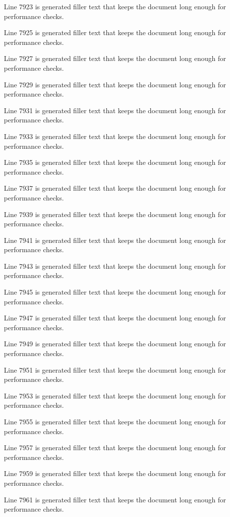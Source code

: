 Line 7923 is generated filler text that keeps the document long enough for performance checks.

Line 7925 is generated filler text that keeps the document long enough for performance checks.

Line 7927 is generated filler text that keeps the document long enough for performance checks.

Line 7929 is generated filler text that keeps the document long enough for performance checks.

Line 7931 is generated filler text that keeps the document long enough for performance checks.

Line 7933 is generated filler text that keeps the document long enough for performance checks.

Line 7935 is generated filler text that keeps the document long enough for performance checks.

Line 7937 is generated filler text that keeps the document long enough for performance checks.

Line 7939 is generated filler text that keeps the document long enough for performance checks.

Line 7941 is generated filler text that keeps the document long enough for performance checks.

Line 7943 is generated filler text that keeps the document long enough for performance checks.

Line 7945 is generated filler text that keeps the document long enough for performance checks.

Line 7947 is generated filler text that keeps the document long enough for performance checks.

Line 7949 is generated filler text that keeps the document long enough for performance checks.

Line 7951 is generated filler text that keeps the document long enough for performance checks.

Line 7953 is generated filler text that keeps the document long enough for performance checks.

Line 7955 is generated filler text that keeps the document long enough for performance checks.

Line 7957 is generated filler text that keeps the document long enough for performance checks.

Line 7959 is generated filler text that keeps the document long enough for performance checks.

Line 7961 is generated filler text that keeps the document long enough for performance checks.

